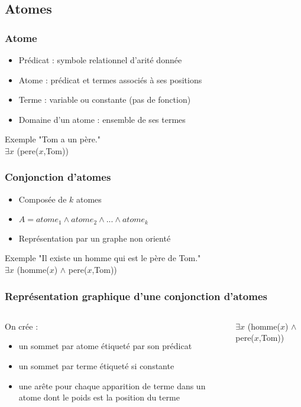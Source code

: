 
\subsection{Atomes}
\begin{frame}
	\frametitle{Atome}
	\begin{center}
	\begin{itemize}
		\item Prédicat : symbole relationnel d'arité donnée
		\item Atome : prédicat et termes associés à ses positions
		\item Terme : variable ou constante (pas de fonction)
		\item Domaine d'un atome : ensemble de ses termes
	\end{itemize}
	\begin{exampleblock}{Exemple}
	"Tom a un père."\\
	$\exists x$ (pere($x$,Tom))
	\end{exampleblock}
	\end{center}
\end{frame}

\begin{frame}
	\frametitle{Conjonction d'atomes}
	\begin{center}
	\begin{itemize}
		\item Composée de $k$ atomes
		\item $A = atome_1 \wedge atome_2 \wedge ... \wedge atome_k$
		\item Représentation par un graphe non orienté
	\end{itemize}
	\begin{exampleblock}{Exemple}
		"Il existe un homme qui est le père de Tom."\\
		$\exists x$ (homme($x$) $\wedge$ pere($x$,Tom))
	\end{exampleblock}
	\end{center}
\end{frame}

\begin{frame}
	\frametitle{Représentation graphique d'une conjonction d'atomes}

	\begin{columns}
	
	\begin{column}{0.45\linewidth}
		On crée :
		\begin{itemize}
			\item un sommet par atome étiqueté par son prédicat 
			\item un sommet par terme étiqueté si constante 
			\item une arête pour chaque apparition de terme dans un atome 
			dont le poids est la position du terme 
		\end{itemize}
	\end{column}
	\vline
	\hfill
	\begin{column}{0.45\linewidth}
		$\exists x$ (homme($x$) $\wedge$ pere($x$,Tom))
	\end{column}
	\end{columns}
\end{frame}

